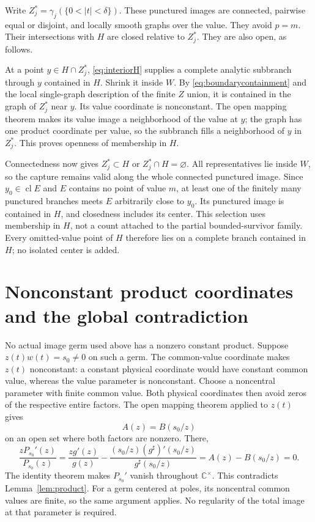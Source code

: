 \documentclass[11pt]{article}
\numberwithin{equation}{section}
\newcommand{\C}{\mathbb C}
\newcommand{\Cs}{\C^{\times}}
\newcommand{\cl}{\operatorname{cl}}
\begin{document}
Write $Z_j^*=\gamma_j(\{0<|t|<\delta\})$.
These punctured images are connected, pairwise equal or disjoint,
and locally smooth graphs over the value. They avoid $p=m$.
Their intersections with $H$ are closed relative to $Z_j^*$.
They are also open, as follows.

At a point $y\in H\cap Z_j^*$, \eqref{eq:interiorH} supplies a complete
analytic subbranch through $y$ contained in $H$. Shrink it inside $W$.
By \eqref{eq:boundarycontainment} and the local single-graph description
of the finite $Z$ union, it is contained in the graph of $Z_j^*$ near $y$.
Its value coordinate is nonconstant. The open mapping theorem makes its
value image a neighborhood of the value at $y$; the graph has one product
coordinate per value, so the subbranch fills a neighborhood of $y$ in
$Z_j^*$. This proves openness of membership in $H$.

Connectedness now gives $Z_j^*\subset H$ or $Z_j^*\cap H=\varnothing$.
All representatives lie inside $W$, so the capture remains valid along
the whole connected punctured image. Since $y_0\in\cl E$ and $E$ contains
no point of value $m$, at least one of the finitely many punctured
branches meets $E$ arbitrarily close to $y_0$. Its punctured image is
contained in $H$, and closedness includes its center.
This selection uses membership in $H$, not a count attached to the
partial bounded-survivor family. Every omitted-value point of $H$
therefore lies on a complete branch contained in $H$; no isolated center
is added.

\section{Nonconstant product coordinates and the global contradiction}
\label{sec:global}

No actual image germ used above has a nonzero constant product.
Suppose $z(t)w(t)=s_0\ne0$ on such a germ. The common-value coordinate
makes $z(t)$ nonconstant: a constant physical coordinate would have
constant common value, whereas the value parameter is nonconstant.
Choose a noncentral parameter with finite common value. Both physical
coordinates then avoid zeros of the respective entire factors.
The open mapping theorem applied to $z(t)$ gives
\[
 A(z)=B(s_0/z)
\]
on an open set where both factors are nonzero. There,
\[
 \frac{zP_{s_0}'(z)}{P_{s_0}(z)}
 =\frac{zg'(z)}{g(z)}
  -\frac{(s_0/z)(g^\sharp)'(s_0/z)}{g^\sharp(s_0/z)}
 =A(z)-B(s_0/z)=0.
\]
The identity theorem makes $P_{s_0}'$ vanish throughout $\Cs$.
This contradicts Lemma~\ref{lem:product}. For a germ centered at poles,
its noncentral common values are finite, so the same argument applies.
No regularity of the total image at that parameter is required.
\end{document}

